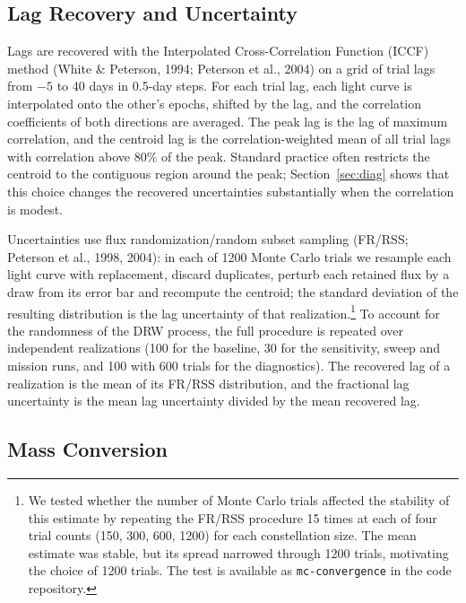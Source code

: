 \documentclass[11pt]{article}
\begin{document}
\subsection{Lag Recovery and Uncertainty}

Lags are recovered with the Interpolated Cross-Correlation Function (ICCF) method (White \& Peterson, 1994; Peterson et al., 2004) on a grid of trial lags from $-5$ to 40 days in 0.5-day steps. For each trial lag, each light curve is interpolated onto the other's epochs, shifted by the lag, and the correlation coefficients of both directions are averaged. The peak lag is the lag of maximum correlation, and the centroid lag is the correlation-weighted mean of all trial lags with correlation above 80\% of the peak. Standard practice often restricts the centroid to the contiguous region around the peak; Section~\ref{sec:diag} shows that this choice changes the recovered uncertainties substantially when the correlation is modest.

Uncertainties use flux randomization/random subset sampling (FR/RSS; Peterson et al., 1998, 2004): in each of 1200 Monte Carlo trials we resample each light curve with replacement, discard duplicates, perturb each retained flux by a draw from its error bar and recompute the centroid; the standard deviation of the resulting distribution is the lag uncertainty of that realization.\footnote{We tested whether the number of Monte Carlo trials affected the stability of this estimate by repeating the FR/RSS procedure 15 times at each of four trial counts (150, 300, 600, 1200) for each constellation size. The mean estimate was stable, but its spread narrowed through 1200 trials, motivating the choice of 1200 trials. The test is available as \texttt{mc-convergence} in the code repository.}
To account for the randomness of the DRW process, the full procedure is repeated over independent realizations (100 for the baseline, 30 for the sensitivity, sweep and mission runs, and 100 with 600 trials for the diagnostics). The recovered lag of a realization is the mean of its FR/RSS distribution, and the fractional lag uncertainty is the mean lag uncertainty divided by the mean recovered lag.

\subsection{Mass Conversion}
\end{document}
